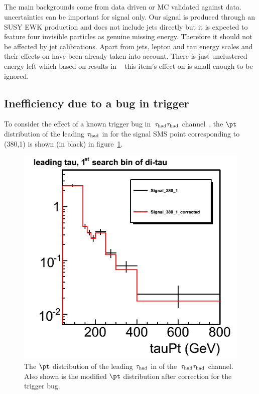 \subsection{\texorpdfstring{\MPT}{MET}}
The main backgrounds come from data driven or MC validated against data. \MPT uncertainties can be important for signal only. Our signal is produced through an SUSY EWK production and does not include jets directly but it is expected to feature four invisible particles as genuine missing energy. Therefore it should not be affected by jet calibrations. Apart from jets, lepton and tau energy scales and their effects on \MPT have been already taken into account. There is just unclustered energy left which based on results in ~\cite{CMS_AN_2014-099} this item's effect on \MPT is small enough to be ignored.



\subsection{\texorpdfstring{Inefficiency due to a bug in \Tau trigger}{Inefficiency due to a bug in tau trigger}}
To consider the effect of a known trigger bug in $\,\tau_{\rm had}\tau_{\rm had}$ channel~\cite{CMS_AN_2014-074}, the $\pt$ 
distribution of the leading $\tau_{\rm had}$ in \binone for the signal SMS point corresponding to (380,1) is shown (in black) in figure~\ref{fig:tauPt}.
\begin{figure}[!Hhtb]
\centering
\includegraphics[angle=0,scale=0.35]{TauTauFigs/leadingTauPt.png}
\caption{The $\pt$ distribution of the leading $\tau_{\rm had}$ in \binone of the $\,\tau_{\rm had}\tau_{\rm had}$ channel. Also shown is the modified $\pt$ distribution after correction for the trigger bug.}
\label{fig:tauPt}
\end{figure}


